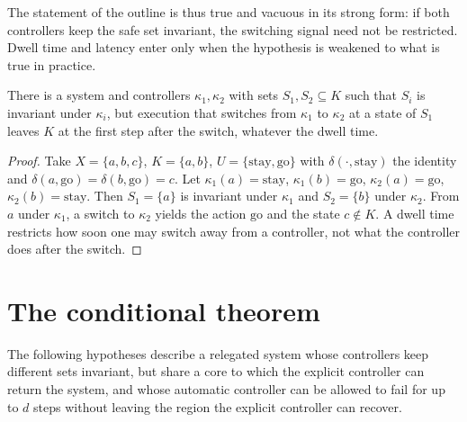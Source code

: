 The statement of the outline is thus true and vacuous in its strong form: if both controllers keep the safe set invariant, the switching signal need not be restricted. Dwell time and latency enter only when the hypothesis is weakened to what is true in practice.

\begin{newresult}\label{prop:differ}
There is a system and controllers $\kappa_1,\kappa_2$ with sets $S_1,S_2\subseteq K$ such that $S_i$ is invariant under $\kappa_i$, but execution that switches from $\kappa_1$ to $\kappa_2$ at a state of $S_1$ leaves $K$ at the first step after the switch, whatever the dwell time.
\end{newresult}
\begin{proof}
Take $X=\{a,b,c\}$, $K=\{a,b\}$, $U=\{\mathrm{stay},\mathrm{go}\}$ with $\delta(\cdot,\mathrm{stay})$ the identity and $\delta(a,\mathrm{go})=\delta(b,\mathrm{go})=c$. Let $\kappa_1(a)=\mathrm{stay}$, $\kappa_1(b)=\mathrm{go}$, $\kappa_2(a)=\mathrm{go}$, $\kappa_2(b)=\mathrm{stay}$. Then $S_1=\{a\}$ is invariant under $\kappa_1$ and $S_2=\{b\}$ under $\kappa_2$. From $a$ under $\kappa_1$, a switch to $\kappa_2$ yields the action $\mathrm{go}$ and the state $c\notin K$. A dwell time restricts how soon one may switch away from a controller, not what the controller does after the switch.
\end{proof}

\section{The conditional theorem}

The following hypotheses describe a relegated system whose controllers keep different sets invariant, but share a core to which the explicit controller can return the system, and whose automatic controller can be allowed to fail for up to $d$ steps without leaving the region the explicit controller can recover.

